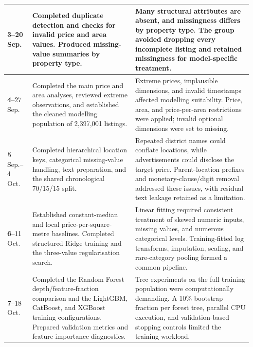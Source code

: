 \begin{longtable}{p{1.7cm}p{6.0cm}p{6.0cm}}
\textbf{3}\newline
14--20 Sep. & Completed duplicate detection and checks for invalid price and area values. Produced missing-value summaries by property type. & Many structural attributes are absent, and missingness differs by property type. The group avoided dropping every incomplete listing and retained missingness for model-specific treatment. \\
\midrule

\textbf{4}\newline
21--27 Sep. & Completed the main price and area analyses, reviewed extreme observations, and established the cleaned modelling population of 2,397,001 listings. & Extreme prices, implausible dimensions, and invalid timestamps affected modelling suitability. Price, area, and price-per-area restrictions were applied; invalid optional dimensions were set to missing. \\
\midrule

\textbf{5}\newline
28 Sep.--4 Oct. & Completed hierarchical location keys, categorical missing-value handling, text preparation, and the shared chronological 70/15/15 split. & Repeated district names could conflate locations, while advertisements could disclose the target price. Parent-location prefixes and monetary-clause/digit removal addressed these issues, with residual text leakage retained as a limitation. \\
\midrule

\textbf{6}\newline
5--11 Oct. & Established constant-median and local price-per-square-metre baselines. Completed structured Ridge training and the three-value regularisation search. & Linear fitting required consistent treatment of skewed numeric inputs, missing values, and numerous categorical levels. Training-fitted log transforms, imputation, scaling, and rare-category pooling formed a common pipeline. \\
\midrule

\textbf{7}\newline
12--18 Oct. & Completed the Random Forest depth/feature-fraction comparison and the LightGBM, CatBoost, and XGBoost training configurations. Prepared validation metrics and feature-importance diagnostics. & Tree experiments on the full training population were computationally demanding. A 10\% bootstrap fraction per forest tree, parallel CPU execution, and validation-based stopping controls limited the training workload. \\
\midrule


\end{longtable}
